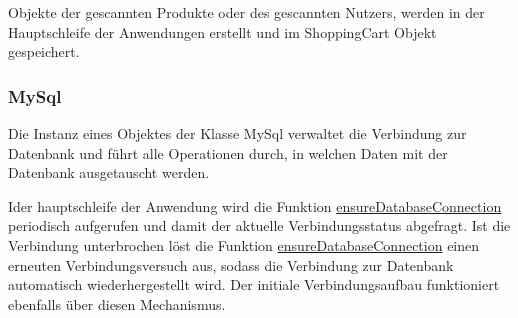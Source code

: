 \documentclass[12pt]{article}
\begin{document}
Objekte der gescannten Produkte oder des gescannten Nutzers, werden in der Hauptschleife der Anwendungen erstellt und im ShoppingCart Objekt gespeichert.


\subsubsection{MySql}
\label{sec:mysql}
Die Instanz eines Objektes der Klasse MySql verwaltet die Verbindung zur Datenbank und führt alle Operationen durch, in welchen Daten mit der Datenbank ausgetauscht werden. 

Ider hauptschleife der Anwendung wird die Funktion \hyperref[func:ensureDatabaseConnection]{ensureDatabaseConnection}  periodisch aufgerufen und damit der aktuelle Verbindungsstatus abgefragt.
Ist die Verbindung unterbrochen löst die Funktion \hyperref[func:ensureDatabaseConnection]{ensureDatabaseConnection} einen erneuten Verbindungsversuch aus, sodass die Verbindung zur Datenbank automatisch wiederhergestellt wird. Der initiale Verbindungsaufbau funktioniert ebenfalls über diesen Mechanismus.
\end{document}
